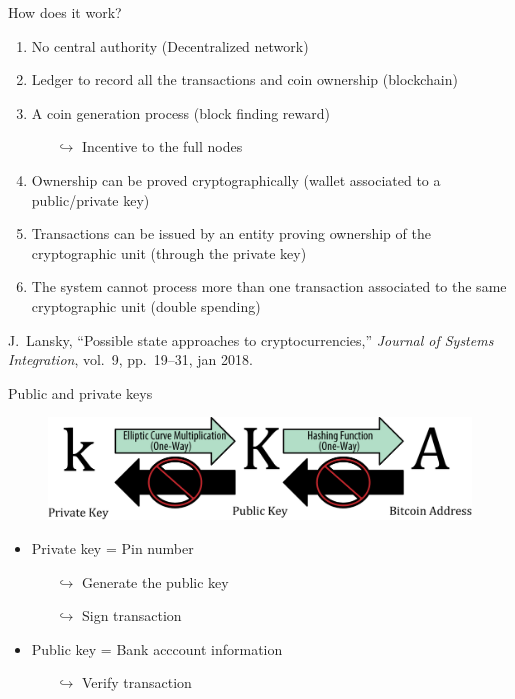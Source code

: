 \documentclass{beamer}
\begin{document}
\begin{frame}{How does it work?}
\begin{enumerate}
  \item No central authority (Decentralized network)
  \item Ledger to record all the transactions and coin ownership (blockchain)
  \item A coin generation process (block finding reward)
    \begin{itemize}
    \item[$\hookrightarrow$] Incentive to the full nodes 
  \end{itemize}
  \item Ownership can be proved cryptographically (wallet associated to a public/private key)
  \item Transactions can be issued by an entity proving ownership of the cryptographic unit (through the private key) 
  \item The system cannot process more than one transaction associated to the same cryptographic unit (double spending)
\end{enumerate}
\tiny
\begin{thebibliography}{1}

J.~Lansky, ``Possible state approaches to cryptocurrencies,'' {\em Journal of
  Systems Integration}, vol.~9, pp.~19--31, jan 2018.

\end{thebibliography}
\end{frame}
\begin{frame}{Public and private keys}
\begin{figure}
  \begin{center}
      \includegraphics[width=\textwidth]{../../Figures/public_private_key}
                         
  \end{center}
\end{figure}
\begin{itemize}
  \item Private key = Pin number 
  \begin{itemize}
    \item[$\hookrightarrow$] Generate the public key
    \item[$\hookrightarrow$] Sign transaction
  \end{itemize}
  \item Public key =  Bank acccount information
  \begin{itemize}
    \item[$\hookrightarrow$] Verify transaction
  \end{itemize}
\end{itemize}
\end{frame}
\end{document}
